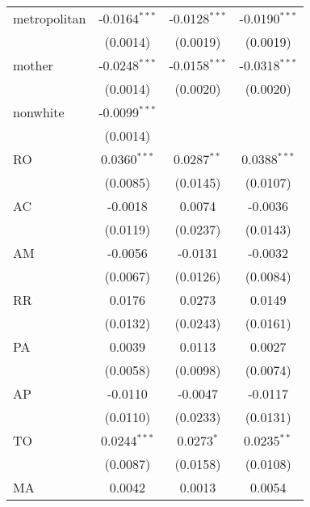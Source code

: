 \begin{tabular}{lccc}
   metropolitan    & -0.0164$^{***}$         & -0.0128$^{***}$         & -0.0190$^{***}$\\   
                   & (0.0014)                & (0.0019)                & (0.0019)\\   
   mother          & -0.0248$^{***}$         & -0.0158$^{***}$         & -0.0318$^{***}$\\   
                   & (0.0014)                & (0.0020)                & (0.0020)\\   
   nonwhite        & -0.0099$^{***}$         &                         &   \\   
                   & (0.0014)                &                         &   \\   
   RO              & 0.0360$^{***}$          & 0.0287$^{**}$           & 0.0388$^{***}$\\   
                   & (0.0085)                & (0.0145)                & (0.0107)\\   
   AC              & -0.0018                 & 0.0074                  & -0.0036\\   
                   & (0.0119)                & (0.0237)                & (0.0143)\\   
   AM              & -0.0056                 & -0.0131                 & -0.0032\\   
                   & (0.0067)                & (0.0126)                & (0.0084)\\   
   RR              & 0.0176                  & 0.0273                  & 0.0149\\   
                   & (0.0132)                & (0.0243)                & (0.0161)\\   
   PA              & 0.0039                  & 0.0113                  & 0.0027\\   
                   & (0.0058)                & (0.0098)                & (0.0074)\\   
   AP              & -0.0110                 & -0.0047                 & -0.0117\\   
                   & (0.0110)                & (0.0233)                & (0.0131)\\   
   TO              & 0.0244$^{***}$          & 0.0273$^{*}$            & 0.0235$^{**}$\\   
                   & (0.0087)                & (0.0158)                & (0.0108)\\   
   MA              & 0.0042                  & 0.0013                  & 0.0054\\   

\end{tabular}
